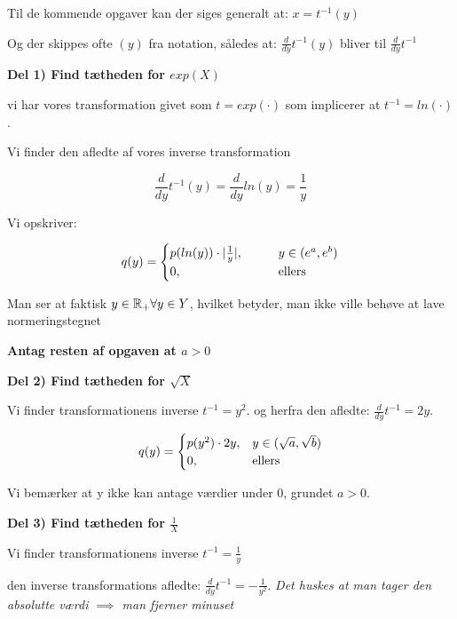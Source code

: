 Til de kommende opgaver kan der siges generalt at: $x = t^{-1} (y) $

Og der skippes ofte $(y)$ fra notation, således at: $\frac{d}{dy}t^{-1}(y)$ bliver til  $\frac{d}{dy}t^{-1}$

\textbf{Del 1) Find tætheden for $exp(X)$}

vi har vores transformation givet som $t = exp(\cdot)$ som implicerer at $t^{-1} = ln(\cdot)$.

Vi finder den afledte af vores inverse transformation

\begin{equation}
    \frac{d}{dy} t^{-1} (y) = \frac{d}{dy} ln (y) = \frac{1}{y}
\end{equation}

Vi opskriver:

\begin{equation}
    q(y) = 
    \begin{cases}
    p( ln(y) ) \cdot \lvert \frac{1}{y} \rvert, \qquad &y \in (e^{a}, e^{b})\\
    0, \qquad &\text{ellers}
    \end{cases}
\end{equation}

Man ser at faktisk $y \in \mathbb{R}_{+} \forall y \in Y$, hvilket betyder, man ikke ville behøve at lave normeringstegnet

\textbf{Antag resten af opgaven at $a>0$}

\textbf{Del 2) Find tætheden for $\sqrt X$}

Vi finder transformationens inverse $t^{-1} = y^2$. og herfra den afledte: $\frac{d}{dy} t^{-1} = 2 y$. 

\begin{equation}
    q(y) = 
    \begin{cases}
        p(y^2) \cdot 2y ,&y \in (\sqrt{a}, \sqrt{b}) \\
        0, &\text{ellers}
    \end{cases}
\end{equation}

Vi bemærker at y ikke kan antage værdier under 0, grundet $a>0$.

\textbf{Del 3) Find tætheden for $\frac{1}{X}$}

Vi finder transformationens inverse $t^{-1} = \frac{1}{y} $

den inverse transformations afledte:
$\frac{d}{dy}t^{-1} =-\frac{1}{y^2}$. \textit{Det huskes at man tager den absolutte værdi $\implies$ man fjerner minuset} 

